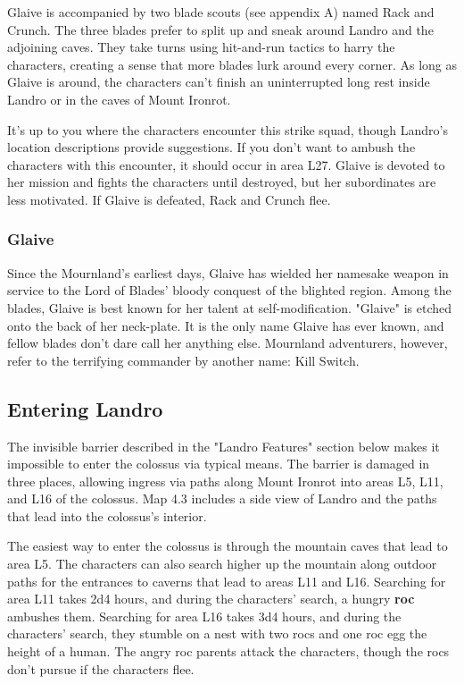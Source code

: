 \documentclass[10pt,a4paper,twoside,bg=print,twocolumn,openany,nodeprecatedcode]{dndbook}
\begin{document}
Glaive is accompanied by two blade scouts (see appendix A) named Rack and Crunch. The three blades prefer to split up and sneak around Landro and the adjoining caves. They take turns using hit-and-run tactics to harry the characters, creating a sense that more blades lurk around every corner. As long as Glaive is around, the characters can't finish an uninterrupted long rest inside Landro or in the caves of Mount Ironrot.

It's up to you where the characters encounter this strike squad, though Landro's location descriptions provide suggestions. If you don't want to ambush the characters with this encounter, it should occur in area L27. Glaive is devoted to her mission and fights the characters until destroyed, but her subordinates are less motivated. If Glaive is defeated, Rack and Crunch flee.

\subsubsection{Glaive}
Since the Mournland's earliest days, Glaive has wielded her namesake weapon in service to the Lord of Blades' bloody conquest of the blighted region. Among the blades, Glaive is best known for her talent at self-modification. "Glaive" is etched onto the back of her neck-plate. It is the only name Glaive has ever known, and fellow blades don't dare call her anything else. Mournland adventurers, however, refer to the terrifying commander by another name: Kill Switch.

\subsection{Entering Landro}
The invisible barrier described in the "Landro Features" section below makes it impossible to enter the colossus via typical means. The barrier is damaged in three places, allowing ingress via paths along Mount Ironrot into areas L5, L11, and L16 of the colossus. Map 4.3 includes a side view of Landro and the paths that lead into the colossus's interior.

The easiest way to enter the colossus is through the mountain caves that lead to area L5. The characters can also search higher up the mountain along outdoor paths for the entrances to caverns that lead to areas L11 and L16. Searching for area L11 takes 2d4 hours, and during the characters' search, a hungry \textbf{roc} ambushes them. Searching for area L16 takes 3d4 hours, and during the characters' search, they stumble on a nest with two rocs and one roc egg the height of a human. The angry roc parents attack the characters, though the rocs don't pursue if the characters flee.
\end{document}

